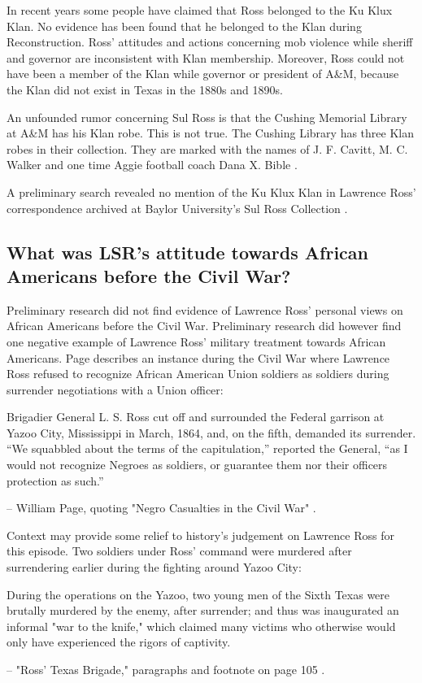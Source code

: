 \documentclass[12pt]{article}
\begin{document}
\begin{displayquote}
In recent years some people have claimed that Ross belonged to the Ku Klux Klan.  No evidence has been found that he belonged to the Klan during Reconstruction.  Ross’ attitudes and actions concerning mob violence while sheriff and governor are inconsistent with Klan membership.  Moreover, Ross could not have been a member of the Klan while governor or president of A\&M, because the Klan did not exist in Texas in the 1880s and 1890s.

An unfounded rumor concerning Sul Ross is that the Cushing Memorial Library at A\&M has his Klan robe.  This is not true.  The Cushing Library has three Klan robes in their collection.  They are marked with the names of J. F. Cavitt, M. C. Walker and one time Aggie football coach Dana X. Bible \cite[pg. 253]{page}.
\end{displayquote}

A preliminary search revealed no mention of the Ku Klux Klan in Lawrence Ross' correspondence archived at Baylor University's Sul Ross Collection \cite{vaughan:email}.

\subsection{What was LSR's attitude towards African Americans before the Civil War?}
Preliminary research did not find evidence of Lawrence Ross' personal views on African Americans before the Civil War. Preliminary research did however find one negative example of Lawrence Ross' military treatment towards African Americans. Page describes an instance during the Civil War where Lawrence Ross refused to recognize African American Union soldiers as soldiers during surrender negotiations with a Union officer:
\begin{displayquote}
Brigadier General L. S. Ross cut off and surrounded the Federal garrison at Yazoo City, Mississippi in March, 1864, and, on the fifth, demanded its surrender.  “We squabbled about the terms of the capitulation,” reported the General, “as I would not recognize Negroes as soldiers, or guarantee them nor their officers protection as such.”

-- William Page, quoting "Negro Casualties in the Civil War" \cite[pg. 62]{page}.
\end{displayquote}

Context may provide some relief to history's judgement on Lawrence Ross for this episode. Two soldiers under Ross' command were murdered after surrendering earlier during the fighting around Yazoo City:
\begin{displayquote}
During the operations on the Yazoo, two young men of the Sixth Texas were brutally murdered by the enemy, after surrender; and thus was inaugurated an informal "war to the knife," which claimed many victims who otherwise would only have experienced the rigors of captivity. 

-- "Ross' Texas Brigade," paragraphs and footnote on page 105 \cite[pg. 105]{texasbrigade}.
\end{displayquote}
\end{document}
